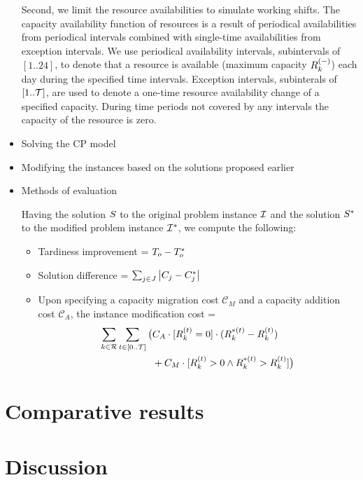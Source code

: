 \begin{itemize}
        Second, we limit the resource availabilities to simulate working shifts. The capacity availability function
        of resources is a result of periodical availabilities from periodical intervals combined with single-time
        availabilities from exception intervals. We use periodical availability intervals, subintervals of $[1 .. 24]$,
        to denote that a resource is available (maximum capacity $\shiftcapacity{k}$) each day during the specified time
        intervals. Exception intervals, subinterals of $[1 .. \mathcal{T}]$, are used to denote a one-time resource
        availability change of a specified capacity. During time periods not covered by any intervals the capacity
        of the resource is zero.


    \item Solving the CP model

    \item Modifying the instances based on the solutions proposed earlier

    \item Methods of evaluation
    
        Having the solution $S$ to the original problem instance $\mathcal{I}$
        and the solution $S^*$ to the modified problem instance $\mathcal{I}^*$,
        we compute the following:
        \begin{itemize}
            \item Tardiness improvement = $T_{o} - T_{o}^*$
            \item Solution difference = $\sum_{j \in J} \left|{C_{j} - C_{j}^*}\right|$
            \item Upon specifying a capacity migration cost $\mathcal{C}_M$ and a capacity addition cost $\mathcal{C}_A$,
                the instance modification cost =
                \begin{align*}
                    \sum_{k \in \Resources} \sum_{t \in \intinterval{0}{\horizon}}
                    \big( &C_A \cdot [\capacity{k}{t} = 0] \cdot (\capacity{k}{t}^* - \capacity{k}{t} ) \\
                    &+ C_M \cdot [\capacity{k}{t} > 0 \land \capacity{k}{t}^* > \capacity{k}{t}] \big)
                \end{align*}

        \end{itemize}
\end{itemize}

\section{Comparative results}

\section{Discussion}
